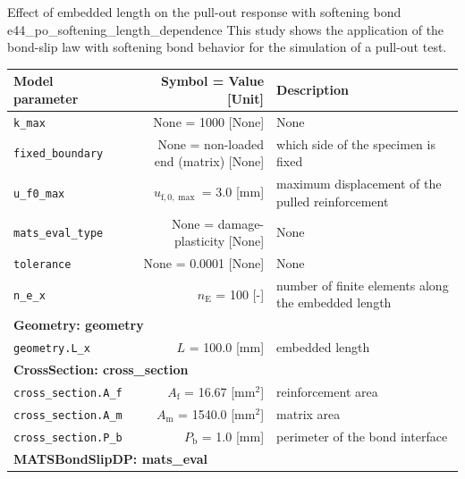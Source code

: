 \documentclass[main.tex]{subfiles}
\begin{document}
\begin{bmcsex}{Effect of embedded length on the pull-out response with softening bond
    }{e44_po_softening_length_dependence}
\noindent This study shows the application of the bond-slip law
    with softening bond behavior for the simulation of a pull-out test. 
     \\
\begin{center}
            
{\scriptsize 
\begin{longtable}{lrp{4cm}}\toprule
\textbf{\textsf{Model parameter}} 
& 
\textbf{\textsf{Symbol = Value [Unit]}} 
&
\textbf{\textsf{Description}}  \\\midrule \midrule
\texttt{k\_max} & None = 1000 [None] & {\footnotesize None}  \\
            \texttt{fixed\_boundary} & None = non-loaded end (matrix) [None] & {\footnotesize which side of the specimen is fixed}  \\
            \texttt{u\_f0\_max} & $u_{\mathrm{f},0,{\max}}$ = 3.0 [mm] & {\footnotesize maximum displacement of the pulled reinforcement}  \\
            \texttt{mats\_eval\_type} & None = damage-plasticity [None] & {\footnotesize None}  \\
            \texttt{tolerance} & None = 0.0001 [None] & {\footnotesize None}  \\
            \texttt{n\_e\_x} & $n_\mathrm{E}$ = 100 [-] & {\footnotesize number of finite elements along the embedded length}  \\
            \midrule
\multicolumn{3}{l}{\textbf{\textsf{Geometry: geometry}}}\\

\texttt{geometry.L\_x} & $L$ = 100.0 [$\mathrm{mm}$] & {\footnotesize embedded length}  \\
            \midrule
\multicolumn{3}{l}{\textbf{\textsf{CrossSection: cross\_section}}}\\

\texttt{cross\_section.A\_f} & $A_\mathrm{f}$ = 16.67 [$\mathrm{mm}^2$] & {\footnotesize reinforcement area}  \\
            \texttt{cross\_section.A\_m} & $A_\mathrm{m}$ = 1540.0 [$\mathrm{mm}^2$] & {\footnotesize matrix area}  \\
            \texttt{cross\_section.P\_b} & $P_\mathrm{b}$ = 1.0 [$\mathrm{mm}$] & {\footnotesize perimeter of the bond interface}  \\
            \midrule
\multicolumn{3}{l}{\textbf{\textsf{MATSBondSlipDP: mats\_eval}}}\\


\end{longtable}}
\end{center}
\end{bmcsex}
\end{document}
